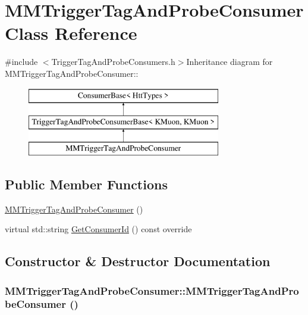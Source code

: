 \hypertarget{classMMTriggerTagAndProbeConsumer}{
\section{MMTriggerTagAndProbeConsumer Class Reference}
\label{classMMTriggerTagAndProbeConsumer}
}


{\ttfamily \#include $<$TriggerTagAndProbeConsumers.h$>$}Inheritance diagram for MMTriggerTagAndProbeConsumer::\begin{figure}[H]
\begin{center}
\leavevmode
\includegraphics[height=3cm]{classMMTriggerTagAndProbeConsumer}
\end{center}
\end{figure}
\subsection*{Public Member Functions}
\begin{DoxyCompactItemize}
\item 
\hyperlink{classMMTriggerTagAndProbeConsumer_abaefa141f2ccda95a5ae0ed6c1ab3a8d}{MMTriggerTagAndProbeConsumer} ()
\item 
virtual std::string \hyperlink{classMMTriggerTagAndProbeConsumer_a469599beb930a3d9cdd3252faefa303a}{GetConsumerId} () const override
\end{DoxyCompactItemize}


\subsection{Constructor \& Destructor Documentation}
\hypertarget{classMMTriggerTagAndProbeConsumer_abaefa141f2ccda95a5ae0ed6c1ab3a8d}{
\subsubsection[{MMTriggerTagAndProbeConsumer}]{\setlength{\rightskip}{0pt plus 5cm}MMTriggerTagAndProbeConsumer::MMTriggerTagAndProbeConsumer ()}}
\label{classMMTriggerTagAndProbeConsumer_abaefa141f2ccda95a5ae0ed6c1ab3a8d}



